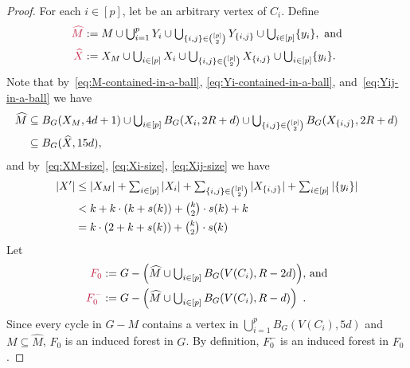 \documentclass{patmorin}
\DeclarePairedDelimiter\set{\{}{\}}
\begin{document}
\begin{proof}
For each $i\in[p]$, let  be an arbitrary vertex of $C_i$.
Define
\begin{align*}
  \mathdefin{\widehat{M}}&:= \textstyle M \cup \bigcup_{i=1}^p Y_i \cup \bigcup_{\set{i,j}\in\binom{[p]}{2}} Y_{\set{i,j}}\cup\bigcup_{i\in[p]}\set{y_i},\ \textrm{and}\\
  \mathdefin{\widehat{X}}&:=\textstyle X_M\cup \bigcup_{i\in[p]} X_i\cup \bigcup_{\set{i,j}\in\binom{[p]}{2}}X_{\set{i,j}}\cup\bigcup_{i\in[p]}\set{y_i}.
\end{align*}
Note that by~\eqref{eq:M-contained-in-a-ball}, \eqref{eq:Yi-contained-in-a-ball}, and~\eqref{eq:Yij-in-a-ball} we have
\begin{equation}\label{m_in_x_ball}
\begin{split}
\widehat{M}&\textstyle\subseteq B_G(X_M,4d+1) \cup \bigcup_{i\in[p]} B_G(X_i,2R+d) \cup \bigcup_{\set{i,j}\in\binom{[p]}{2}} B_G(X_{\set{i,j}},2R+d)\\
&\subseteq B_G(\widehat{X}, 15d), 
\end{split} 
\end{equation}
and by~\eqref{eq:XM-size}, \eqref{eq:Xi-size}, \eqref{eq:Xij-size} we have
\begin{equation}
\begin{split}
|X'|& \textstyle \leq |X_M| + \sum_{i\in[p]}|X_i| + \sum_{\set{i,j}\in\binom{[p]}{2}} |X_{\set{i,j}}| + \sum_{i\in[p]} |\{y_i\}|  \\
&\textstyle< k + k\cdot (k+s(k)) + \binom{k}{2}\cdot s(k) + k \\
&\textstyle= k\cdot(2+k+s(k)) + \binom{k}{2}\cdot s(k)
\end{split} \label{x_prime_size}
\end{equation}
Let
\begin{align*}
\mathdefin{F_0}&:=\textstyle{G-\left(\widehat{M}\cup \bigcup_{i\in[p]} B_G(V(C_i),R-2d)\right)}\text{, and}\\
\mathdefin{F^-_0}&:=\textstyle{G-\left(\widehat{M}\cup \bigcup_{i\in[p]} B_G(V(C_i),R-d)\right)} \enspace . 
\end{align*}
Since every cycle in $G-M$ contains a vertex in $\bigcup_{i=1}^p B_G(V(C_i),5d)$ and $M\subseteq \widehat{M}$, $F_0$ is an induced forest in $G$. By definition, $F^-_0$  is an induced forest in $F_0$.


\end{proof}
\end{document}
